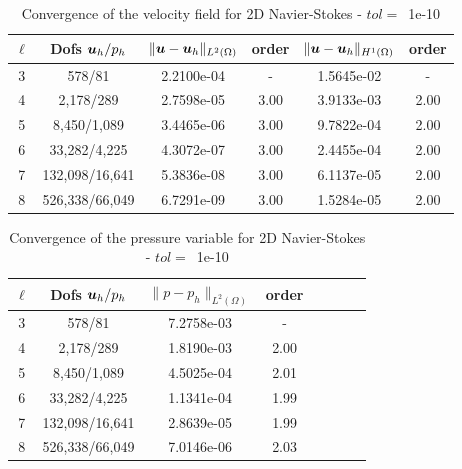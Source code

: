 \begin{table}[h!]
\begin{center}
\begin{tabular}{cccccc}
\hline
$\ell$ &    Dofs $\boldsymbol u_h/p_h$ & $\|\boldsymbol u-\boldsymbol u_h\|_{L^2(\Omega)}$ & order & $\|\boldsymbol u-\boldsymbol u_h\|_{H^1(\Omega)}$ & order  \\
\hline
 3 &     578/81 &  2.2100e-04 &     - &  1.5645e-02 &     - \\
 4 &    2,178/289 &  2.7598e-05 &     3.00 &  3.9133e-03 &     2.00   \\
 5 &    8,450/1,089 &  3.4465e-06 &     3.00 &  9.7822e-04 &     2.00   \\
 6 &   33,282/4,225 &  4.3072e-07 &     3.00 &  2.4455e-04 &     2.00   \\
 7 &  132,098/16,641 &  5.3836e-08 &     3.00 &  6.1137e-05 &     2.00   \\
 8 &  526,338/66,049 &  6.7291e-09 &     3.00 &  1.5284e-05 &     2.00   \\
\hline
\end{tabular}
\caption{Convergence of the velocity field for 2D Navier-Stokes - $tol=$~1e-10}
\label{tab:NS_2D_smooth_velocity}
\end{center}
\end{table}
\begin{table}[h!]
\begin{center}
\begin{tabular}{cccccccc}
\hline
$\ell$ &    Dofs $\boldsymbol u_h/p_h$ &         $\|{p}-{p}_h\|_{L^2(\Omega)}$ & order \\
\hline
 3 &     578/81 &7.2758e-03 &      - \\
 4 &    2,178/289 &  1.8190e-03 &      2.00 \\
 5 &    8,450/1,089 &  4.5025e-04 &      2.01 \\
 6 &   33,282/4,225 &  1.1341e-04 &      1.99 \\
 7 &  132,098/16,641 &  2.8639e-05 &      1.99 \\
 8 &  526,338/66,049 &  7.0146e-06 &      2.03 \\


\hline
\end{tabular}
\caption{Convergence of the pressure variable for 2D Navier-Stokes - $tol=$~1e-10}
\label{tab:NS_2D_smooth_pressure}
\end{center}
\end{table}


